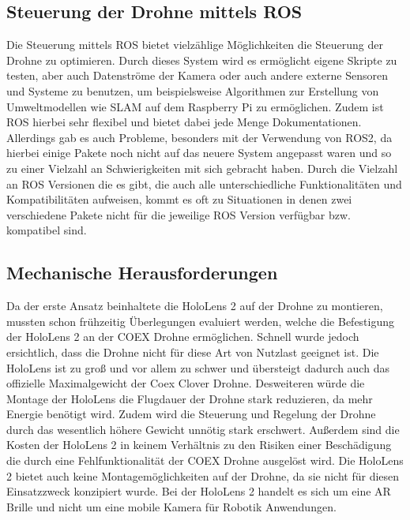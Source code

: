 \subsection{Steuerung der Drohne mittels ROS}\label{steuerung_drohne_ros:subsection}
Die Steuerung mittels \ac{ROS} bietet vielzählige Möglichkeiten die Steuerung der Drohne zu optimieren. Durch dieses System wird es ermöglicht eigene Skripte zu testen, aber auch Datenströme der Kamera oder auch andere externe Sensoren und Systeme zu benutzen, um beispielsweise Algorithmen zur Erstellung von Umweltmodellen wie \ac{SLAM} auf dem Raspberry Pi zu ermöglichen. Zudem ist \ac{ROS} hierbei sehr flexibel und bietet dabei jede Menge Dokumentationen.
Allerdings gab es auch Probleme, besonders mit der Verwendung von ROS2, da hierbei einige Pakete noch nicht auf das neuere System angepasst waren und so zu einer Vielzahl an Schwierigkeiten mit sich gebracht haben. Durch die Vielzahl an \ac{ROS} Versionen die es gibt, die auch alle unterschiedliche Funktionalitäten und Kompatibilitäten aufweisen, kommt es oft zu Situationen in denen zwei verschiedene Pakete nicht für die jeweilige \ac{ROS} Version verfügbar bzw. kompatibel sind.


\subsection{Mechanische Herausforderungen}\label{mechanische-herausforderungen:section}

Da der erste Ansatz beinhaltete die HoloLens 2 auf der Drohne zu montieren, mussten schon frühzeitig Überlegungen evaluiert werden, welche die Befestigung der HoloLens 2 an der COEX Drohne ermöglichen. Schnell wurde jedoch ersichtlich, dass die Drohne nicht für diese Art von Nutzlast geeignet ist. Die HoloLens ist zu groß und vor allem zu schwer und übersteigt dadurch auch das offizielle Maximalgewicht der Coex Clover Drohne. Desweiteren würde die Montage der HoloLens die Flugdauer der Drohne stark reduzieren, da mehr Energie benötigt wird. Zudem wird die Steuerung und Regelung der Drohne durch das wesentlich höhere Gewicht unnötig stark erschwert. Außerdem sind die Kosten der HoloLens 2 in keinem Verhältnis zu den Risiken einer Beschädigung die durch eine Fehlfunktionalität der COEX Drohne ausgelöst wird. Die HoloLens 2 bietet auch keine Montagemöglichkeiten auf der Drohne, da sie nicht für diesen Einsatzzweck konzipiert wurde. Bei der HoloLens 2 handelt es sich um eine \ac{AR} Brille und nicht um eine mobile Kamera für Robotik Anwendungen.

